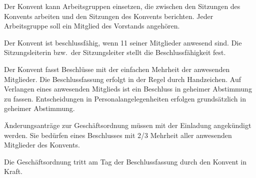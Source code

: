 \documentclass[a4paper, parskip=half, numbers=noenddot]{scrartcl}
\begin{document}
\begin{contract}
Der Konvent kann Arbeitsgruppen einsetzen, die zwischen den Sitzungen des Konvents arbeiten
und den Sitzungen des Konvents berichten.
Jeder Arbeitsgruppe soll ein Mitglied des Vorstands angehören.

Der Konvent ist beschlussfähig, wenn 11 seiner Mitglieder anwesend sind. Die Sitzungsleiterin bzw.\ der Sitzungsleiter stellt die Beschlussfähigkeit fest.	

Der Konvent fasst Beschlüsse mit der einfachen Mehrheit der anwesenden Mitglieder. Die
Beschlussfassung erfolgt in der Regel durch Handzeichen. Auf Verlangen eines
anwesenden Mitglieds ist ein Beschluss in geheimer Abstimmung zu fassen. 
Entscheidungen in Personalangelegenheiten erfolgen grundsätzlich in geheimer Abstimmung.

Änderungsanträge zur Geschäftsordnung müssen mit der Einladung angekündigt werden. Sie
bedürfen eines Beschlusses mit 2/3 Mehrheit aller anwesenden Mitglieder des Konvents.

Die Geschäftsordnung tritt am Tag der Beschlussfassung durch den Konvent in Kraft.


\end{contract}
\end{document}
